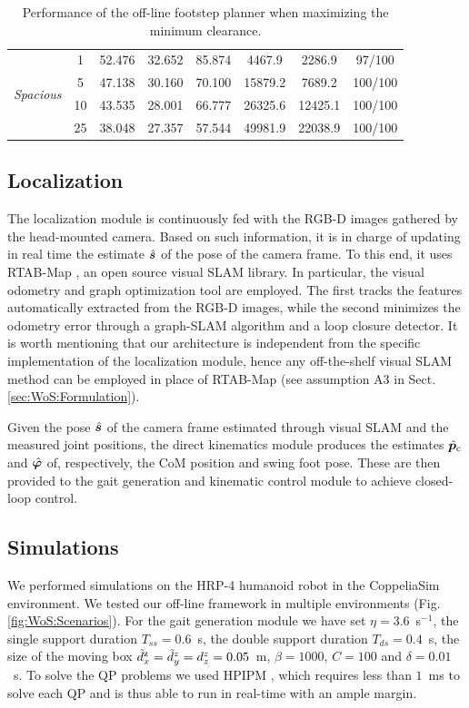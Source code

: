 \begin{table}
\begin{tabular}{*{8}{c}}
        \hline   
        \multirow{4}{*}{\textit{Spacious}} & 1 & 52.476 & 32.652 & 85.874 & 4467.9 & 2286.9 & 97/100 \\
         & 5 & 47.138 & 30.160 & 70.100 & 15879.2 & 7689.2 & 100/100 \\
         & 10 & 43.535 & 28.001 & 66.777 & 26325.6 & 12425.1 & 100/100 \\
         & 25 & 38.048 & 27.357 & 57.544 & 49981.9 & 22038.9 & 100/100 \\ 
        
    \end{tabular}
    \caption{Performance of the off-line footstep planner when maximizing the minimum clearance.}
    \label{tab:benchmark:off-line:clearance}
\end{table}

\subsection{Localization}
\label{sec:WoS:offlineCase:Localization}

The localization module is continuously fed with the RGB-D images gathered by
the head-mounted camera.
Based on such information, it is in charge of updating in real time the estimate
$\hat{{\bm{s}}}$ of the pose of the camera frame.
To this end, it uses RTAB-Map \cite{Labbe2019RTABMap}, an open source visual
SLAM library. 
In particular, the visual odometry and graph optimization tool are employed.
The first tracks the features automatically extracted from the RGB-D images,
while the second minimizes the odometry error through a graph-SLAM algorithm
and a loop closure detector.
It is worth mentioning that our architecture is independent from the specific
implementation of the localization module, hence any off-the-shelf visual SLAM
method can be employed in place of RTAB-Map (see assumption A3 in
Sect. \ref{sec:WoS:Formulation}).

Given the pose $\hat{{\bm{s}}}$ of the camera frame estimated through visual SLAM
and the measured joint positions, the direct kinematics module produces the
estimates $\hat{{\bm{p}}}_{\rm c}$ and $\hat{{\bm{\varphi}}}$ of, respectively, the
CoM position and swing foot pose. These are then provided to the gait generation
and kinematic control module to achieve closed-loop control.

\subsection{Simulations}
\label{sec:WoS:offlineCase:Simulations}
We performed simulations on the HRP-4 humanoid robot in the CoppeliaSim
environment. We tested our off-line framework in multiple environments
(Fig. \ref{fig:WoS:Scenarios}). For the gait generation module we have set
$\eta = 3.6$~s$^{-1}$, the single support duration $T_{ss}=0.6$~s, the double
support duration $T_{ds}=0.4$~s, the size of the moving box
$\tilde{d}_x^{\rm z}=\tilde{d}_y^z=d_z^z=0.05$~m, $\beta=1000$, $C=100$ and
$\delta = 0.01$~s. To solve the QP problems we used HPIPM \cite{Frison2020HPIPM}, which
requires less than $1$~ms to solve each QP and is thus able to run in real-time
with an ample margin.

